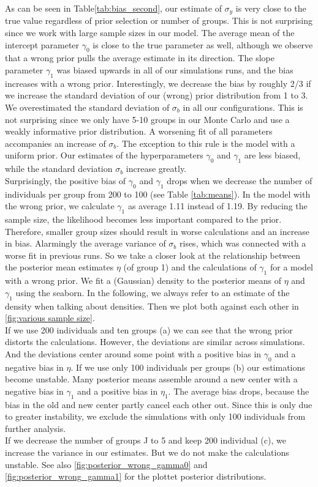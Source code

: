As can be seen in Table\ref{tab:bias_second}, our estimate of $\sigma_y$ is very close to the true value regardless of prior selection or number of groups. This is not surprising since we work with large sample sizes in our model.
The average mean of the intercept parameter $\gamma_0$ is close to the true parameter as well, although we observe that a wrong prior pulls the average estimate in its direction.
The slope parameter $\gamma_1$ was biased upwards in all of our simulations runs, and the bias increases with a wrong prior. Interestingly, we decrease the bias by roughly 2/3 if we increase the standard deviation of our (wrong) prior distribution from 1 to 3. \\
We overestimated the standard deviation of $\sigma_b$ in all our configurations. This is not surprising since we only have 5-10 groups in our Monte Carlo and use a weakly informative prior distribution. A worsening fit of all parameters accompanies an increase of $\sigma_b$. The exception to this rule is the model with a uniform prior. Our estimates of the hyperparameters $\gamma_0$ and $\gamma_1$ are less biased, while the standard deviation $\sigma_b$ increase greatly.\\

Surprisingly, the positive bias of $\gamma_0$ and $\gamma_1$ drops when we decrease the number of individuals per group from 200 to 100 (see Table \ref{tab:means}). In the model with the wrong prior, we calculate $\gamma_1$ as average 1.11 instead of 1.19.
By reducing the sample size, the likelihood becomes less important compared to the prior. Therefore, smaller group sizes should result in worse calculations and an increase in bias. Alarmingly the average variance of $\sigma_b$ rises, which was connected with a worse fit in previous runs. So we take a closer look at the relationship between the posterior mean estimates $\eta$ (of group 1) and the calculations of $\gamma_1$ for a model with a wrong prior.
We fit a (Gaussian) density to the posterior means of $\eta$ and $\gamma_1$ using the seaborn. In the following, we always refer to an estimate of the density when talking about densities.
Then we plot both against each other in \ref{fig:various sample size}. \\
If we use 200 individuals and ten groups (a) we can see that the wrong prior distorts the calculations. However, the deviations are similar across simulations. And the deviations center around some point with a positive bias in $\gamma_0$ and a negative bias in $\eta$.
If we use only 100 individuals per groups (b) our estimations become unstable. Many posterior means assemble around a new center with a negative bias in $\gamma_1$ and a positive bias in $\eta_1$. The average bias drops, because the bias in the old and new center partly cancel each other out. Since this is only due to greater instability, we exclude the simulations with only 100 individuals from further analysis.\\
If we decrease the number of groups J to 5 and keep 200 individual (c), we increase the variance in our estimates. But we do not make the calculations unstable.
See also \ref{fig:posterior_wrong_gamma0} and \ref{fig:posterior_wrong_gamma1} for the plottet posterior distributions.

